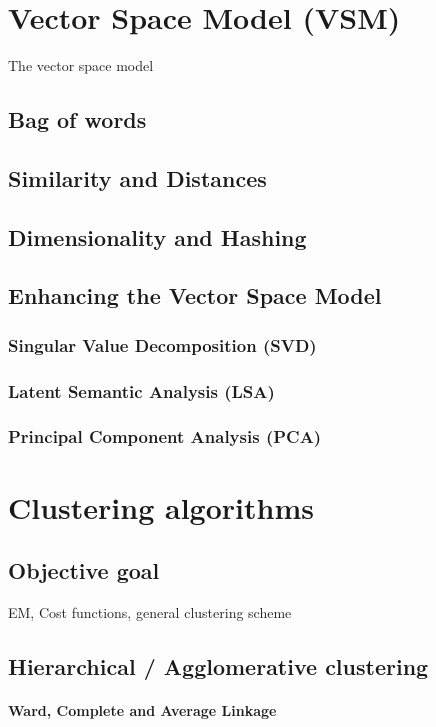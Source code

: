 \begin{itemize}
\begin{description}
\section{Vector Space Model (VSM)}
  
  The vector space model
  \subsection{Bag of words}
  \subsection{Similarity and Distances}
  \subsection{Dimensionality and Hashing}

  \subsection{Enhancing the Vector Space Model}
    \subsubsection{Singular Value Decomposition (SVD)}
    \subsubsection{Latent Semantic Analysis (LSA)}
    \subsubsection{Principal Component Analysis (PCA)}

\section{Clustering algorithms}

  \subsection{Objective goal}
    EM, Cost functions, general clustering scheme

  \subsection{Hierarchical / Agglomerative clustering}
    \paragraph{Ward, Complete and Average Linkage}

\end{description}
\end{itemize}
